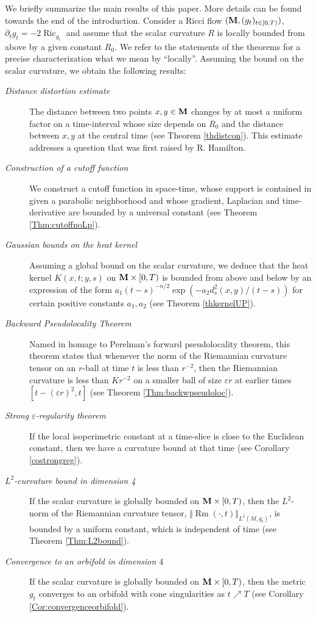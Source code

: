 \documentclass[11pt]{amsart}
\numberwithin{equation}{section}
\def\M{{\bf M}}
\DeclareMathOperator{\Ric}{Ric}
\DeclareMathOperator{\Rm}{Rm}
\numberwithin{equation}{section}
\begin{document}
We briefly summarize the main results of this paper.
More details can be found towards the end of the introduction.
Consider a Ricci flow  $(\M, (g_t)_{t \in [0,T)})$, $\partial_t g_t = -2 \Ric_{g_t}$ and assume that the scalar curvature $R$ is locally bounded from above by a given constant $R_0$.
We refer to the statements of the theorems for a precise characterization what we mean by ``locally''. 
Assuming the bound on the scalar curvature, we obtain the following results:
\begin{description}
\item[\it Distance distortion estimate]  The distance between two points $x, y \in \M$ changes by at most a uniform factor on a time-interval whose size depends on $R_0$ and the distance between $x, y$ at the central time (see Theorem \ref{thdistcon}).
This estimate addresses a question that was first raised by R. Hamilton.
\item[\it Construction of a cutoff function] We construct a cutoff function in space-time, whose support is contained in given a parabolic neighborhood and whose gradient, Laplacian and time-derivative are bounded by a universal constant (see Theorem \ref{Thm:cutoffnoLp}).
\item[\it Gaussian bounds on the heat kernel] Assuming a global bound on the scalar curvature, we deduce that the heat kernel $K(x,t;y,s)$ on $\M \times [0,T)$ is bounded from above and below by an expression of the form $a_1 (t-s)^{-n/2} \exp (- a_2 d_s^2 (x,y) /  (t-s))$ for certain positive constants $a_1, a_2$ (see Theorem \ref{thkernelUP}).
\item[\it Backward Pseudolocality Theorem] Named in homage to Perelman's forward pseudolocality theorem, this theorem states that whenever the norm of the Riemannian curvature tensor on an $r$-ball at time $t$ is less than $r^{-2}$, then the Riemannian curvature is less than $K r^{-2}$ on a smaller ball of size $\varepsilon r$ at earlier times $[ t - (\varepsilon r)^2, t]$ (see Theorem \ref{Thm:backwpseudoloc}).
\item[\it Strong $\varepsilon$-regularity theorem] If the local isoperimetric constant at a time-slice is close to the Euclidean constant, then we have a curvature bound at that time (see Corollary \ref{costrongreg}).
\item[\it $L^2$-curvature bound in dimension 4] If the scalar curvature is globally bounded on $\M \times [0, T)$, then the $L^2$-norm of the Riemannian curvature tensor, $\Vert {\Rm} (\cdot, t) \Vert_{L^2(M, g_t)}$, is bounded by a uniform constant, which is independent of time (see Theorem \ref{Thm:L2bound}).
\item[\it Convergence to an orbifold in dimension $4$] If the scalar curvature is globally bounded on $\M \times [0, T)$, then the metric $g_t$ converges to an orbifold with cone singularities as $t \nearrow T$ (see Corollary \ref{Cor:convergenceorbifold}).
\end{description}
\end{document}
